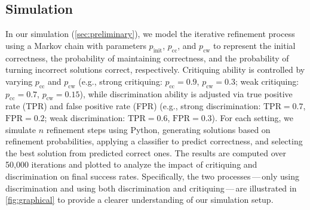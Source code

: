 \subsection{Simulation}\label{appendix:simulation}
In our simulation (\cref{sec:preliminary}), we model the iterative refinement process using a Markov chain with parameters $p_{\mathrm{init}}$, $p_{\mathrm{cc}}$, and $p_{\mathrm{cw}}$ to represent the initial correctness, the probability of maintaining correctness, and the probability of turning incorrect solutions correct, respectively. Critiquing ability is controlled by varying $p_{\mathrm{cc}}$ and $p_{\mathrm{cw}}$ (e.g., strong critiquing: $p_{\mathrm{cc}}=0.9$, $p_{\mathrm{cw}}=0.3$; weak critiquing: $p_{\mathrm{cc}}=0.7$, $p_{\mathrm{cw}}=0.15$), while discrimination ability is adjusted via true positive rate (TPR) and false positive rate (FPR) (e.g., strong discrimination: $\mathrm{TPR}=0.7$, $\mathrm{FPR}=0.2$; weak discrimination: $\mathrm{TPR}=0.6$, $\mathrm{FPR}=0.3$). For each setting, we simulate $n$ refinement steps using Python, generating solutions based on refinement probabilities, applying a classifier to predict correctness, and selecting the best solution from predicted correct ones. The results are computed over 50,000 iterations and plotted to analyze the impact of critiquing and discrimination on final success rates.
Specifically, the two processes\,---\,only using discrimination and using both discrimination and critiquing\,---\,are illustrated in \cref{fig:graphical} to provide a clearer understanding of our simulation setup.

